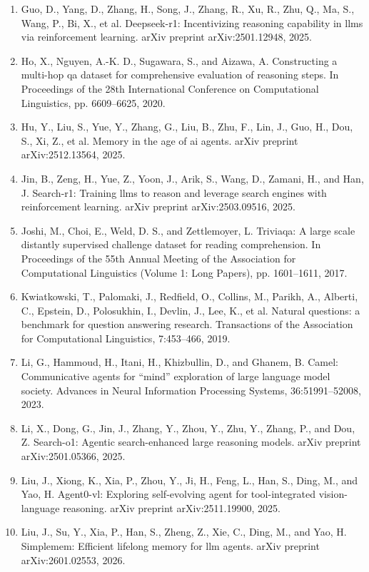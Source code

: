 \documentclass[11pt,UTF8,fontset=fandol]{ctexart}
\begin{document}
\begin{enumerate}[leftmargin=2em,itemsep=0.15em]
\item Guo, D., Yang, D., Zhang, H., Song, J., Zhang, R., Xu, R., Zhu, Q., Ma, S., Wang, P., Bi, X., et al. Deepseek-r1: Incentivizing reasoning capability in llms via reinforcement learning. arXiv preprint arXiv:2501.12948, 2025.
\item Ho, X., Nguyen, A.-K. D., Sugawara, S., and Aizawa, A. Constructing a multi-hop qa dataset for comprehensive evaluation of reasoning steps. In Proceedings of the 28th International Conference on Computational Linguistics, pp. 6609--6625, 2020.
\item Hu, Y., Liu, S., Yue, Y., Zhang, G., Liu, B., Zhu, F., Lin, J., Guo, H., Dou, S., Xi, Z., et al. Memory in the age of ai agents. arXiv preprint arXiv:2512.13564, 2025.
\item Jin, B., Zeng, H., Yue, Z., Yoon, J., Arik, S., Wang, D., Zamani, H., and Han, J. Search-r1: Training llms to reason and leverage search engines with reinforcement learning. arXiv preprint arXiv:2503.09516, 2025.
\item Joshi, M., Choi, E., Weld, D. S., and Zettlemoyer, L. Triviaqa: A large scale distantly supervised challenge dataset for reading comprehension. In Proceedings of the 55th Annual Meeting of the Association for Computational Linguistics (Volume 1: Long Papers), pp. 1601--1611, 2017.
\item Kwiatkowski, T., Palomaki, J., Redfield, O., Collins, M., Parikh, A., Alberti, C., Epstein, D., Polosukhin, I., Devlin, J., Lee, K., et al. Natural questions: a benchmark for question answering research. Transactions of the Association for Computational Linguistics, 7:453--466, 2019.
\item Li, G., Hammoud, H., Itani, H., Khizbullin, D., and Ghanem, B. Camel: Communicative agents for ``mind'' exploration of large language model society. Advances in Neural Information Processing Systems, 36:51991--52008, 2023.
\item Li, X., Dong, G., Jin, J., Zhang, Y., Zhou, Y., Zhu, Y., Zhang, P., and Dou, Z. Search-o1: Agentic search-enhanced large reasoning models. arXiv preprint arXiv:2501.05366, 2025.
\item Liu, J., Xiong, K., Xia, P., Zhou, Y., Ji, H., Feng, L., Han, S., Ding, M., and Yao, H. Agent0-vl: Exploring self-evolving agent for tool-integrated vision-language reasoning. arXiv preprint arXiv:2511.19900, 2025.
\item Liu, J., Su, Y., Xia, P., Han, S., Zheng, Z., Xie, C., Ding, M., and Yao, H. Simplemem: Efficient lifelong memory for llm agents. arXiv preprint arXiv:2601.02553, 2026.

\end{enumerate}
\end{document}
